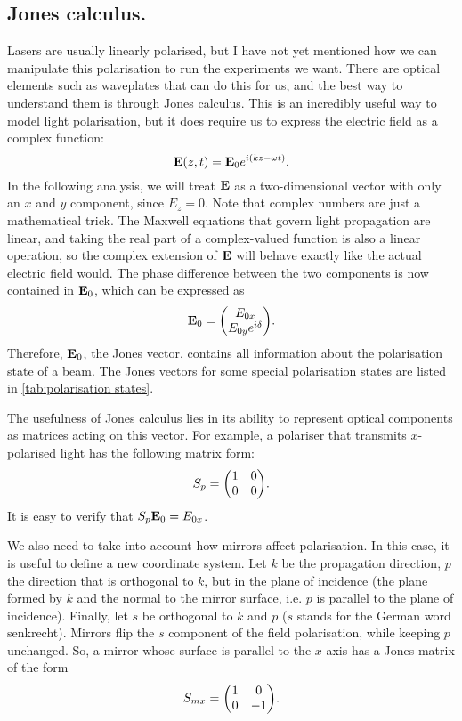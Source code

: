 \subsection{Jones calculus.} Lasers are usually linearly polarised, but I have not yet mentioned how we can manipulate this polarisation to run the experiments we want. There are optical elements such as waveplates that can do this for us, and the best way to understand them is through Jones calculus. This is an incredibly useful way to model light polarisation, but it does require us to express the electric field as a complex function:
\begin{equation}
	\vb{E}(z, t) = \vb{E}_0 e^{i(kz-\omega t)}.
	\label{eq:propagator}
\end{equation}
In the following analysis, we will treat $ \vb{E} $ as a two-dimensional vector with only an $ x $ and $ y $ component, since $ E_z = 0 $. Note that complex numbers are just a mathematical trick. The Maxwell equations that govern light propagation are linear, and taking the real part of a complex-valued function is also a linear operation, so the complex extension of $ \vb{E} $ will behave exactly like the actual electric field would. The phase difference between the two components is now contained in $ \vb{E}_0 $, which can be expressed as
\begin{equation}
	\vb{E}_0 = \mqty(\Eox \\ \Eoy e^{i\delta} ).
\end{equation}
Therefore, $ \vb{E}_0 $, the Jones vector, contains all information about the polarisation state of a beam. The Jones vectors for some special polarisation states are listed in \autoref{tab:polarisation states}.

The usefulness of Jones calculus lies in its ability to represent optical components as matrices acting on this vector. For example, a polariser that transmits $ x $-polarised light has the following matrix form:
\begin{equation}
	S_p = \mqty(1 & 0 \\ 0 & 0).
\end{equation}
It is easy to verify that $ S_p \vb{E}_0 = E_{0x} $. 

We also need to take into account how mirrors affect polarisation. In this case, it is useful to define a new coordinate system. Let $ k $ be the propagation direction, $ p $ the direction that is orthogonal to $ k $, but in the plane of incidence (the plane formed by $ k $ and the normal to the mirror surface, i.e. $ p $ is parallel to the plane of incidence). Finally, let $ s $ be orthogonal to $ k $ and $ p $ ($ s $ stands for the German word senkrecht). Mirrors flip the $ s $ component of the field polarisation, while keeping $ p $ unchanged. So, a mirror whose surface is parallel to the $ x $-axis has a Jones matrix of the form
\begin{equation}
	S_{mx} = \mqty(1 & 0 \\ 0 & -1).
\end{equation}

